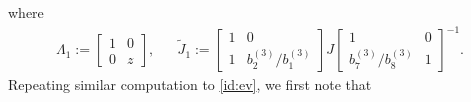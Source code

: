 \documentclass[a4paper,reqno,11pt]{amsart}
\numberwithin{equation}{section}
\numberwithin{figure}{section}
\theoremstyle{plain}
\theoremstyle{remark}
\numberwithin{rhp}{section}
\begin{document}
where
\begin{align}
 \Lambda_1 := \begin{bmatrix}
       1  & 0 \\
        0 & z
    \end{bmatrix},   && \widetilde{J}_1 := {\begin{bmatrix}
       1 & 0 \\
        1 & b_2^{(3)}/b_1^{(3)}
    \end{bmatrix}} J \begin{bmatrix}
       1  & 0 \\
        b_7^{(3)}/b_8^{(3)} & 1
    \end{bmatrix}^{-1}.\label{id:Jtil}
\end{align}
Repeating similar computation to \eqref{id:ev}, we first note that  
\end{document}
